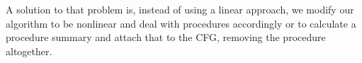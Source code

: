 \documentclass[11pt, a4paper, BCOR=10mm, ngerman]{scrbook}
\begin{document}
A solution to that problem is, instead of using a linear approach, we modify our algorithm to be nonlinear and deal with procedures accordingly \cite{DBLP:conf/sat/HoderB12} or to calculate a procedure summary and attach that to the CFG, removing the procedure altogether.
%

%
%
\end{document}
